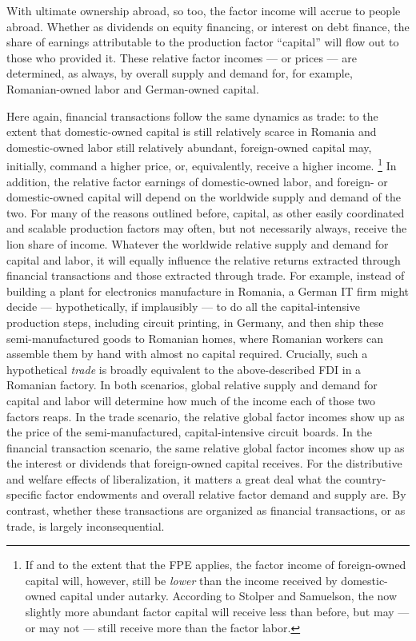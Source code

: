 \begin{enumerate}
	With ultimate ownership abroad, so too, the factor income will accrue to people abroad.
	Whether as dividends on equity financing, or interest on debt finance, the share of earnings attributable to the production factor ``capital'' will flow out to those who provided it.
	These relative factor incomes --- or prices --- are determined, as always, by overall supply and demand for, for example, Romanian-owned labor and German-owned capital.

	Here again, financial transactions follow the same dynamics as trade:
	to the extent that domestic-owned capital is still relatively scarce in Romania and domestic-owned labor still relatively abundant, foreign-owned capital may, initially, command a higher price, or, equivalently, receive a higher income.
	\footnote{
		If and to the extent that the \gls{FPE}  applies, the factor income of foreign-owned capital will, however, still be \emph{lower} than the income received by domestic-owned capital under autarky.
		According to Stolper and Samuelson, the now slightly more abundant factor capital will receive less than before, but may --- or may not --- still receive more than the factor labor.
	}
	In addition, the relative factor earnings of domestic-owned labor, and foreign- or domestic-owned capital will depend on the worldwide supply and demand of the two.
	For many of the reasons outlined before, capital, as other easily coordinated and scalable production factors may often, but not necessarily always, receive the lion share of income.
	Whatever the worldwide relative supply and demand for capital and labor, it will equally influence the relative returns extracted through financial transactions and those extracted through trade.
	For example, instead of building a plant for electronics manufacture in Romania, a German IT firm might decide --- hypothetically, if implausibly --- to do all the capital-intensive production steps, including circuit printing, in Germany, and then ship these semi-manufactured goods to Romanian homes, where Romanian workers can assemble them by hand with almost no capital required.
	Crucially, such a hypothetical \emph{trade} is broadly equivalent to the above-described \gls{FDI} in a Romanian factory.
	In both scenarios, global relative supply and demand for capital and labor will determine how much of the income each of those two factors reaps.
	In the trade scenario, the relative global factor incomes show up as the price of the semi-manufactured, capital-intensive circuit boards.
	In the financial transaction scenario, the same relative global factor incomes show up as the interest or dividends that foreign-owned capital receives.
	For the distributive and welfare effects of liberalization, it matters a great deal what the country-specific factor endowments and overall relative factor demand and supply are.
	By contrast, whether these transactions are organized as financial transactions, or as trade, is largely inconsequential.
\end{enumerate}

